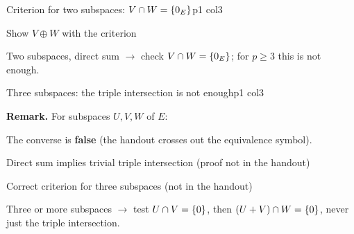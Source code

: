 \documentclass[sheet,noautoquant,noautokw]{neyvia-study}
\begin{document}
\begin{concept}[1.26]{Criterion for two subspaces: $V\cap W=\left\{0_E\right\}$}{p1 col3}
\begin{definition}
\end{definition}
\begin{method}{Show $V\oplus W$ with the criterion}
\end{method}
\begin{reflex}
Two subspaces, direct sum \ensuremath{\rightarrow} check $V\cap W=\left\{0_E\right\}$; for $p\ge3$ this is not enough.
\end{reflex}
\end{concept}
\begin{concept}[1.27]{Three subspaces: the triple intersection is not enough}{p1 col3}
\begin{definition}
\noindent \textbf{Remark.} For subspaces $U,V,W$ of $E$:
\par\noindent The converse is \textbf{false} (the handout crosses out the equivalence symbol).
\end{definition}
\begin{method}{Direct sum implies trivial triple intersection (proof not in the handout)}
\end{method}
\begin{method}{Correct criterion for three subspaces (not in the handout)}
\end{method}
\begin{reflex}
Three or more subspaces \ensuremath{\rightarrow} test $U\cap V=\left\{0\right\}$, then $(U+V)\cap W=\left\{0\right\}$, never just the triple intersection.
\end{reflex}
\end{concept}
\end{document}
